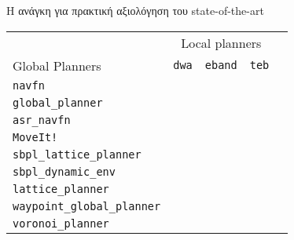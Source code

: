 \begin{frame}{Η ανάγκη για πρακτική αξιολόγηση του state-of-the-art}
{\footnotesize
\begin{table}[h]
\begin{tabular}{lcccc}
  & \multicolumn{3}{c}{Local planners} \\
  \cline{2-4}
  Global Planners                    & \texttt{dwa}                               & \texttt{eband}                             & \texttt{teb} \\ \toprule
  \texttt{navfn}                     &&&        \\
  \texttt{global\_planner}           &&&       \\
  \texttt{asr\_navfn}                &&&       \\
  \texttt{MoveIt!}                   &&&       \\
  \texttt{sbpl\_lattice\_planner}    &&&     \\
  \texttt{sbpl\_dynamic\_env}        &&&     \\
  \texttt{lattice\_planner}          &&&       \\
  \texttt{waypoint\_global\_planner} &&&   \\
  \texttt{voronoi\_planner}          &&&       \\ \bottomrule
\end{tabular}
\end{table}
}

\end{frame}
